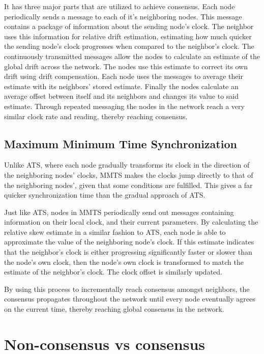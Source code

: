 \documentclass[a0,24pt]{sciposter}
\begin{document}
\begin{multicols}{2}
It has three major parts that are utilized to achieve consensus. Each node periodically sends a message to each of it's neighboring nodes. This message contains a package of information about the sending node's clock. The neighbor uses this information for relative drift estimation, estimating how much quicker the sending node's clock progresses when compared to the neighbor's clock. The continuously transmitted messages allow the nodes to calculate an estimate of the global drift across the network. The nodes use this estimate to correct its own drift using drift compensation. Each node uses the messages to average their estimate with its neighbors' stored estimate. Finally the nodes calculate an average offset between itself and its neighbors and changes its value to said estimate. Through repeated messaging the nodes in the network reach a very similar clock rate and reading, thereby reaching consensus.

\subsection{Maximum Minimum Time Synchronization}
Unlike ATS, where each node gradually transforms its clock in the direction of the neighboring nodes' clocks, MMTS makes the clocks jump directly to that of the neighboring nodes', given that some conditions are fulfilled. This gives a far quicker synchronization time than the gradual approach of ATS.

Just like ATS, nodes in MMTS periodically send out messages containing information on their local clock, and their current parameters. By calculating the relative skew estimate in a similar fashion to ATS, each node is able to approximate the value of the neighboring node's clock. If this estimate indicates that the neighbor's clock is either progressing significantly faster or slower than the node's own clock, then the node's own clock is transformed to match the estimate of the neighbor's clock. The clock offset is similarly updated.

By using this process to incrementally reach consensus amongst neighbors, the consensus propagates throughout the network until every node eventually agrees on the current time, thereby reaching global consensus in the network.

\section{Non-consensus vs consensus}


\end{multicols}
\end{document}
